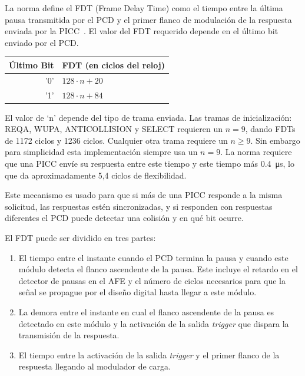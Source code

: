 \documentclass[a4paper, twoside, 11pt]{report}
\begin{document}
La norma define el FDT (Frame Delay Time) como el tiempo entre la última pausa transmitida por el PCD y el primer flanco de modulación de la respuesta enviada por la PICC~\cite{iso14443-3}. El valor del FDT requerido depende en el último bit enviado por el PCD.

\begin{tabular}{r | l}
    \textbf{Último} Bit & \textbf{FDT (en ciclos del reloj)} \\
    \hline
    '0' & $128 \cdot n + 20$ \\
    '1' & $128 \cdot n + 84$ \\
\end{tabular}

El valor de ‘n’ depende del tipo de trama enviada. Las tramas de inicialización: REQA, WUPA, ANTICOLLISION y SELECT requieren un $n = 9$, dando FDTs de 1172 ciclos y 1236 ciclos. Cualquier otra trama requiere un $n \ge 9$. Sin embargo para simplicidad esta implementación siempre usa un $n = 9$. La norma requiere que una PICC envíe su respuesta entre este tiempo y este tiempo más \SI{0.4}{\micro\second}, lo que da aproximadamente 5,4 ciclos de flexibilidad.

Este mecanismo es usado para que si más de una PICC responde a la misma solicitud, las respuestas estén sincronizadas, y si responden con respuestas diferentes el PCD puede detectar una colisión y en qué bit ocurre.

El FDT puede ser dividido en tres partes:

\begin{enumerate}
  \item El tiempo entre el instante cuando el PCD termina la pausa y cuando este módulo detecta el flanco ascendente de la pausa. Este incluye el retardo en el detector de pausas en el AFE y el número de ciclos necesarios para que la señal se propague por el diseño digital hasta llegar a este módulo.
  \item La demora entre el instante en cual el flanco ascendente de la pausa es detectado en este módulo y la activación de la salida \textit{trigger} que dispara la transmisión de la respuesta.
  \item El tiempo entre la activación de la salida \textit{trigger} y el primer flanco de la respuesta llegando al modulador de carga.
\end{enumerate}
\end{document}
